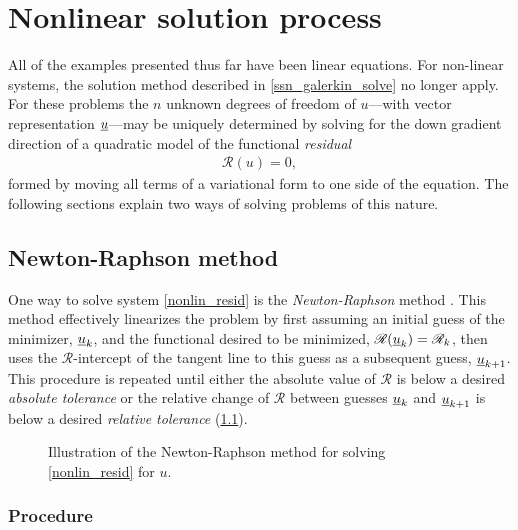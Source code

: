 
\chapter{Nonlinear solution process} \label{ssn_nonlinear_solution_process}

All of the examples presented thus far have been linear equations.  For non-linear systems, the solution method described in \cref{ssn_galerkin_solve} no longer apply.  For these problems the $n$ unknown degrees of freedom of $u$---with vector representation $\underline{u}$---may be uniquely determined by solving for the down gradient direction of a quadratic model of the functional  \emph{residual}
\begin{align}
  \label{nonlin_resid}
  \mathscr{R}(u) = 0,
\end{align}
formed by moving all terms of a variational form to one side of the equation.  The following sections explain two ways of solving problems of this nature.




\section{Newton-Raphson method} \label{ssn_newton_raphson}

One way to solve system \cref{nonlin_resid} is the  \emph{Newton-Raphson} method \citep{nocedal_2000}.  This method effectively linearizes the problem by first assuming an initial guess of the minimizer, $\underline{u}_k$, and the functional desired to be minimized, $\mathscr{R}(\underline{u}_k) = \mathscr{R}_k$, then uses the $\mathscr{R}$-intercept of the tangent line to this guess as a subsequent guess, $\underline{u}_{k+1}$.  This procedure is repeated until either the absolute value of $\mathscr{R}$ is below a desired \emph{absolute tolerance} or the relative change of $\mathscr{R}$ between guesses $\underline{u}_k$ and $\underline{u}_{k+1}$ is below a desired \emph{relative tolerance} (\cref{nr_image}).

\begin{figure}
  \centering
    \def\svgwidth{\linewidth}
    
  \caption[Newton-Raphson diagram]{Illustration of the Newton-Raphson method for solving \cref{nonlin_resid} for $u$.}
  \label{nr_image}
\end{figure}

\subsection{Procedure}

